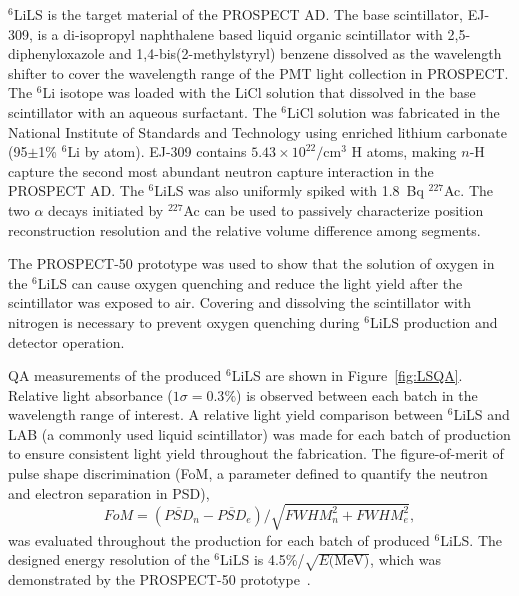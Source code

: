 \label{sec:LiLS}

$^6$LiLS is the target material of the PROSPECT AD.
The base scintillator, EJ-309, is a di-isopropyl naphthalene based liquid organic scintillator with 2,5-diphenyloxazole and 1,4-bis(2-methylstyryl) benzene dissolved as the wavelength shifter to cover the wavelength range of the PMT light collection in PROSPECT.
The $^6$Li isotope was loaded with the LiCl solution that dissolved in the base scintillator with an aqueous surfactant.
The $^6$LiCl solution was fabricated in the National Institute of Standards and Technology using enriched lithium carbonate (95$\pm$1\% $^6$Li by atom).
EJ-309 contains $5.43\times10^{22}/\textrm{cm}^3$ H atoms, making $n$-H capture the second most abundant neutron capture interaction in the PROSPECT AD.
The $^6$LiLS was also uniformly spiked with 1.8~Bq $^{227}$Ac. 
The two $\alpha$ decays initiated by $^{227}$Ac can be used to passively characterize position reconstruction resolution and the relative volume difference among segments.

The PROSPECT-50 prototype was used to show that the solution of oxygen in the $^6$LiLS can cause oxygen quenching and reduce the light yield after the scintillator was exposed to air.
Covering and dissolving the scintillator with nitrogen is necessary to prevent oxygen quenching during $^6$LiLS production and detector operation.

QA measurements of the produced $^6$LiLS are shown in Figure~\ref{fig:LSQA}.
Relative light absorbance ($1\sigma = 0.3\%$) is observed between each batch in the wavelength range of interest.
A relative light yield comparison between $^6$LiLS and LAB (a commonly used liquid scintillator) was made for each batch of production to ensure consistent light yield throughout the fabrication.
The figure-of-merit of pulse shape discrimination (FoM, a parameter defined to quantify the neutron and electron separation in PSD),
\begin{equation}
	FoM = (\overline{PSD}_n - \overline{PSD}_e)/\sqrt{FWHM^2_n+ FWHM^2_e},
\end{equation}
was evaluated throughout the production for each batch of produced $^6$LiLS.
The designed energy resolution of the $^6$LiLS is 4.5\%/$\sqrt{E\textrm{(MeV)}}$, which was demonstrated by the PROSPECT-50 prototype~\cite{bib:P50}.

